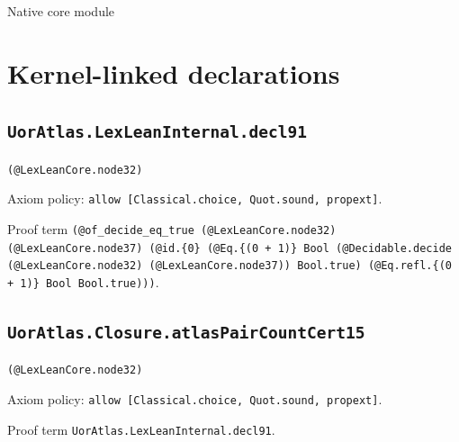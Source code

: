 \documentclass[11pt]{article}
\begin{document}
\begin{center}{\LARGE Native core module}\end{center}
\section*{Kernel-linked declarations}
\subsection*{\texttt{UorAtlas.LexLeanInternal.decl91}}
\noindent\texttt{(@LexLeanCore.node32)}\par
\noindent Axiom policy: \texttt{allow [Classical.choice, Quot.sound, propext]}.\par
\noindent Proof term \texttt{(@of\_decide\_eq\_true (@LexLeanCore.node32) (@LexLeanCore.node37) (@id.\{0\} (@Eq.\{(0 + 1)\} Bool (@Decidable.decide (@LexLeanCore.node32) (@LexLeanCore.node37)) Bool.true) (@Eq.refl.\{(0 + 1)\} Bool Bool.true)))}.\par
\subsection*{\texttt{UorAtlas.Closure.atlasPairCountCert15}}
\noindent\texttt{(@LexLeanCore.node32)}\par
\noindent Axiom policy: \texttt{allow [Classical.choice, Quot.sound, propext]}.\par
\noindent Proof term \texttt{UorAtlas.LexLeanInternal.decl91}.\par
\end{document}
